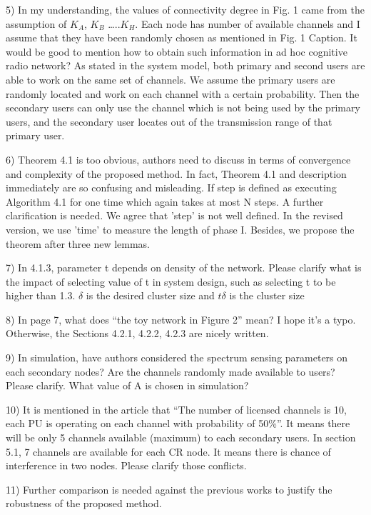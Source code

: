\documentclass[10pt,a4paper]{article}
\begin{document}
    5)  In my understanding, the values of connectivity degree in Fig. 1 came from the assumption of $K_A$, $K_B$ …..$K_H$. Each node has number of available channels and I assume that they have been randomly chosen as mentioned in Fig. 1 Caption. It would be good to mention how to obtain such information in ad hoc cognitive radio network?
    As stated in the system model, both primary and second users are able to work on the same set of channels. 
    We assume the primary users are randomly located and work on each channel with a certain probability.
    Then the secondary users can only use the channel which is not being used by the primary users, and the secondary user locates out of the transmission range of that primary user.
    
    6)  Theorem 4.1 is too obvious, authors need to discuss in terms of convergence and complexity of the proposed method. In fact, Theorem 4.1 and description immediately are so confusing and misleading. If step is defined as executing Algorithm 4.1 for one time which again takes at most N steps. A further clarification is needed.
    We agree that 'step' is not well defined.
	In the revised version, we use 'time' to measure the length of phase I.
	Besides, we propose the theorem after three new lemmas.
	
	7)  In 4.1.3, parameter t depends on density of the network. Please clarify what is the impact of selecting value of t in system design, such as selecting t to be higher than 1.3.
	$\delta$ is the desired cluster size and $t\delta$ is the cluster size     
    
    8)  In page 7, what does “the toy network in Figure 2” mean? I hope it’s a typo. Otherwise, the Sections 4.2.1, 4.2.2, 4.2.3 are nicely written.
    
    9)  In simulation, have authors considered the spectrum sensing parameters on each secondary nodes? Are the channels randomly made available to users? Please clarify. What value of A is chosen in simulation?
    
    10) It is mentioned in the article that “The number of licensed channels is 10, each PU is operating on each channel with probability of 50\%”. It means there will be only 5 channels available (maximum) to each secondary users. In section 5.1, 7 channels are available for each CR node. It means there is chance of interference in two nodes. Please clarify those conflicts.
    
    11) Further comparison is needed against the previous works to justify the robustness of the proposed method.
\end{document}
